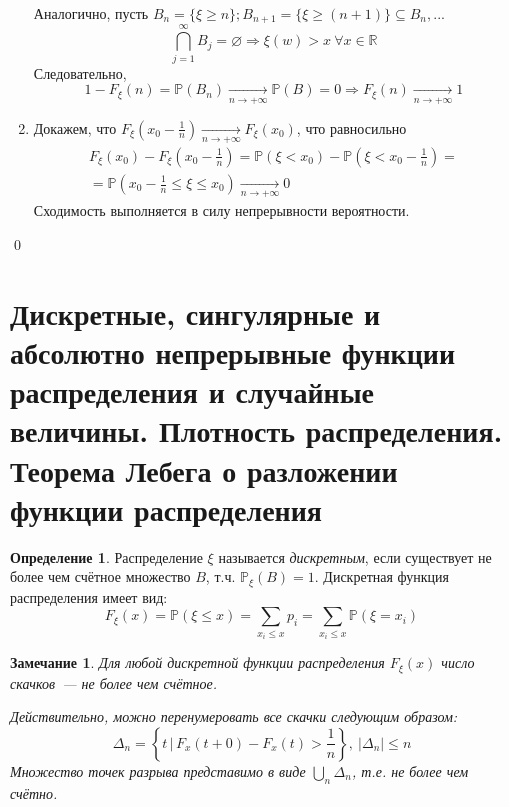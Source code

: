 \documentclass[oneside,final,14pt]{extreport}
\newcommand\myprob[1]{{\mathbb{P}(#1)}}
\renewenvironment{proof}{{\bfseries Доказательство.}}{\qed}
\newtheorem*{rmrk}{Замечание}
\theoremstyle{definition}
\newtheorem{defn}{Определение}[section]
\begin{document}
\begin{proof}
\begin{enumerate}
        Аналогично, пусть $B_n = \{\xi \geq n\}; B_{n+1} = \{ \xi \geq (n+1) \} \subseteq B_n, ...$
        \begin{equation*}
            \bigcap\limits_{j = 1}^{\infty}B_j = \varnothing \Rightarrow \xi(w) > x~\forall x \in \mathbb{R}
        \end{equation*}
        Следовательно, 
        \begin{equation*}
            1 - F_\xi(n) = \myprob{B_n} \xrightarrow[n \rightarrow +\infty]{} \myprob{B} = 0 \Rightarrow F_\xi(n) \xrightarrow[n \rightarrow +\infty]{}1
        \end{equation*}
    \item
        Докажем, что $F_\xi(x_0 - \frac{1}{n}) \xrightarrow[n \rightarrow +\infty]{} F_\xi(x_0)$, что равносильно 
        \begin{multline*}
            F_\xi(x_0) - F_\xi \left(x_0 - \frac{1}{n} \right) 
            = \myprob{\xi < x_0} - \myprob{\xi < x_0 - \frac{1}{n}} = \\ 
            = \myprob{x_0 - \frac{1}{n} \leqslant \xi \leqslant x_0} \xrightarrow[n \to +\infty]{} 0
                \end{multline*}
        Сходимость выполняется в силу непрерывности вероятности.
\end{enumerate}
\end{proof}

\section{Дискретные, сингулярные и абсолютно непрерывные функции распределения и случайные величины. Плотность распределения. Теорема Лебега о разложении функции распределения}

\begin{defn}
    Распределение $\xi$ называется {\it дискретным}, если существует не более чем счётное множество $B$, т.ч. $\mathbb{P}_\xi(B) = 1$. Дискретная функция распределения имеет вид:
    \begin{equation*}
        F_\xi(x) = \mathbb{P}(\xi \leqslant x) = \sum_{x_i \leqslant x}{}p_{i} = \sum_{x_i \leqslant x}{}\mathbb{P}(\xi = x_{i})
    \end{equation*}
\end{defn}

\begin{rmrk}
    Для любой дискретной функции распределения $F_\xi(x)$ число скачков~--- не более чем счётное.
    
    Действительно, можно перенумеровать все скачки следующим образом:
    \begin{equation*}
        \Delta_{n}=\left\{t \,|\, F_{x}(t+0)-F_{x}(t)>\frac{1}{n}\right\},~ |\Delta_{n} | \leqslant n
    \end{equation*}
    Множество точек разрыва представимо в виде $\bigcup\limits_{n} \Delta_{n}$, т.е. не более чем счётно.
\end{rmrk}
\end{document}
